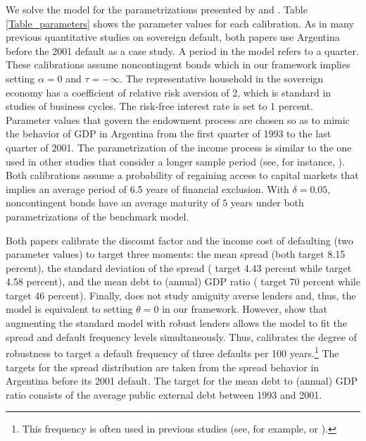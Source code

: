 We solve the model for the parametrizations presented by \cite{Chatty} and \cite{PouzoPresno2016}. Table \ref{Table_parameters} shows the parameter values for each calibration. As in many previous quantitative studies on sovereign default, both papers use Argentina before the 2001 default as a case study. A period in the model refers to a quarter. These calibrations assume noncontingent bonds which in our framework implies setting $\alpha=0$ and $\tau  =-\infty$. The representative household in the sovereign economy has a coefficient of relative risk aversion of 2, which is standard in studies of business cycles. The risk-free interest rate is set to 1 percent. Parameter values that govern the endowment process are chosen so as to mimic the behavior of GDP in Argentina from the first quarter of 1993 to the last quarter of 2001. The parametrization of the income process is similar to the one used in other studies that consider a longer sample period (see, for instance, \citealp{AG_06}). Both calibrations assume a probability of regaining access to capital markets that implies an average period of 6.5 years of financial exclusion. With $\delta = 0.05$, noncontingent bonds have an average maturity of $5$ years under both parametrizations of the benchmark model.

Both papers calibrate the discount factor and the income cost of defaulting (two parameter values) to target three moments: the mean spread (both target 8.15 percent), the standard deviation of the spread (\citealp{Chatty} target 4.43 percent while \citealp{PouzoPresno2016} target 4.58 percent), and the mean debt to (annual) GDP ratio (\citealp{Chatty} target 70 percent while \citealp{PouzoPresno2016} target 46 percent). Finally, \cite{Chatty} does not study amiguity averse lenders and, thus, the model is equivalent to setting $\theta = 0$ in our framework. However, \cite{PouzoPresno2016} show that augmenting the standard model with robust lenders allows the model to fit the spread and default frequency levels simultaneously. Thus, \cite{PouzoPresno2016} calibrates the degree of robustness to target a default frequency of three defaults per 100 years.\footnote{This frequency is often used in previous studies (see, for example, \citealp{Arellano05} or \citealp{AG_06}).} The targets for the spread distribution are taken from the spread behavior in Argentina before its 2001 default. The target for the mean debt to (annual) GDP ratio consists of the average public external debt between 1993 and 2001.



